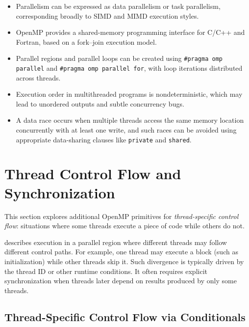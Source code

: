 \begin{itemize}
    \item Parallelism can be expressed as data parallelism or task parallelism, corresponding broadly to SIMD and MIMD execution styles.
    \item OpenMP provides a shared-memory programming interface for C/C++ and Fortran, based on a fork--join execution model.
    \item Parallel regions and parallel loops can be created using \texttt{\#pragma omp parallel} and \texttt{\#pragma omp parallel for}, with loop iterations distributed across threads.
    \item Execution order in multithreaded programs is nondeterministic, which may lead to unordered outputs and subtle concurrency bugs.
    \item A data race occurs when multiple threads access the same memory location concurrently with at least one write, and such races can be avoided using appropriate data-sharing clauses like \texttt{private} and \texttt{shared}.
\end{itemize}



\section{Thread Control Flow and Synchronization}
\label{sec:thread-control}

This section explores additional OpenMP primitives for \emph{thread-specific control flow}: situations where some threads execute a piece of code while others do not. 

\begin{ppdefn}
 describes execution in a parallel region where different threads may follow different control paths.
For example, one thread may execute a block (such as initialization) while other threads skip it.
Such divergence is typically driven by the thread ID or other runtime conditions.
It often requires explicit synchronization when threads later depend on results produced by only some threads.
\end{ppdefn}

\subsection{Thread-Specific Control Flow via Conditionals}

